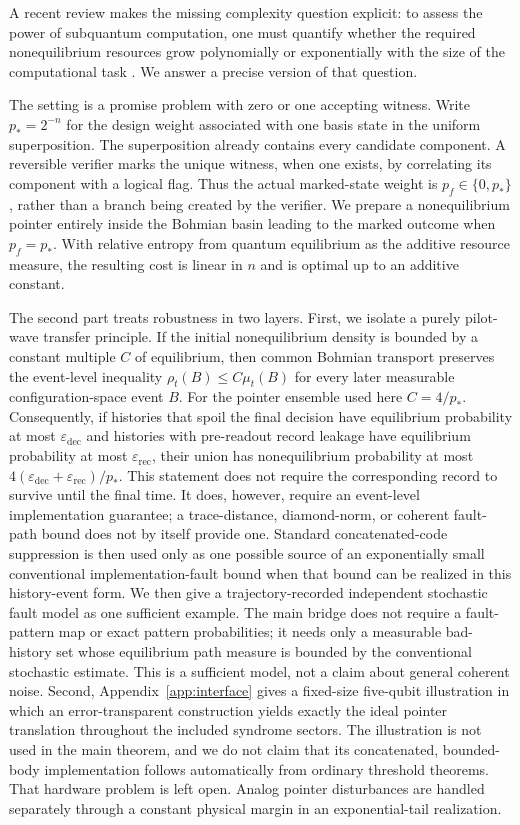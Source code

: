 \documentclass[pdflatex,sn-mathphys-num]{sn-jnl}
\theoremstyle{thmstyleone}
\begin{document}
A recent review makes the missing complexity question explicit: to assess the power of subquantum computation, one must quantify whether the required nonequilibrium resources grow polynomially or exponentially with the size of the computational task \cite{Valentini2025}. We answer a precise version of that question.

The setting is a promise problem with zero or one accepting witness. Write $p_*=2^{-n}$ for the design weight associated with one basis state in the uniform superposition. The superposition already contains every candidate component. A reversible verifier marks the unique witness, when one exists, by correlating its component with a logical flag. Thus the actual marked-state weight is $p_f\in\{0,p_*\}$, rather than a branch being created by the verifier. We prepare a nonequilibrium pointer entirely inside the Bohmian basin leading to the marked outcome when $p_f=p_*$. With relative entropy from quantum equilibrium as the additive resource measure, the resulting cost is linear in $n$ and is optimal up to an additive constant.

The second part treats robustness in two layers. First, we isolate a purely pilot-wave transfer principle. If the initial nonequilibrium density is bounded by a constant multiple $C$ of equilibrium, then common Bohmian transport preserves the event-level inequality $\rho_t(B)\le C\mu_t(B)$ for every later measurable configuration-space event $B$. For the pointer ensemble used here $C=4/p_*$. Consequently, if histories that spoil the final decision have equilibrium probability at most $\varepsilon_{\mathrm{dec}}$ and histories with pre-readout record leakage have equilibrium probability at most $\varepsilon_{\mathrm{rec}}$, their union has nonequilibrium probability at most $4(\varepsilon_{\mathrm{dec}}+\varepsilon_{\mathrm{rec}})/p_*$. This statement does not require the corresponding record to survive until the final time. It does, however, require an event-level implementation guarantee; a trace-distance, diamond-norm, or coherent fault-path bound does not by itself provide one. Standard concatenated-code suppression is then used only as one possible source of an exponentially small conventional implementation-fault bound when that bound can be realized in this history-event form. We then give a trajectory-recorded independent stochastic fault model as one sufficient example. The main bridge does not require a fault-pattern map or exact pattern probabilities; it needs only a measurable bad-history set whose equilibrium path measure is bounded by the conventional stochastic estimate. This is a sufficient model, not a claim about general coherent noise. Second, Appendix~\ref{app:interface} gives a fixed-size five-qubit illustration in which an error-transparent construction yields exactly the ideal pointer translation throughout the included syndrome sectors. The illustration is not used in the main theorem, and we do not claim that its concatenated, bounded-body implementation follows automatically from ordinary threshold theorems. That hardware problem is left open. Analog pointer disturbances are handled separately through a constant physical margin in an exponential-tail realization.
\end{document}
